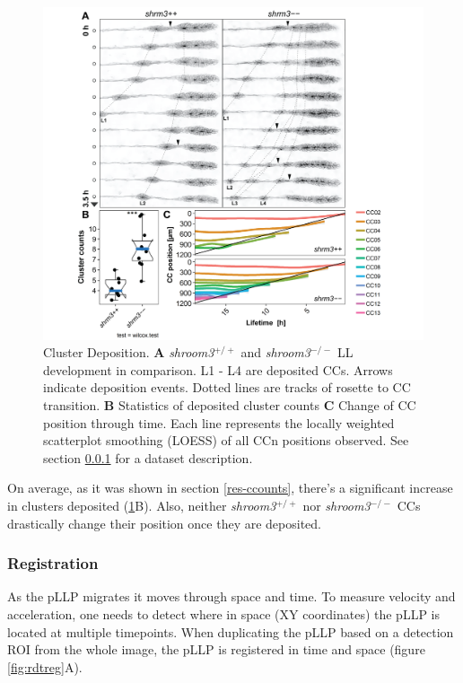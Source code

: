 \documentclass[10pt, b5paper, singlespacinge, twoside]{reedthesis} %
\theoremstyle{definition}
\theoremstyle{definition}
\theoremstyle{definition}
\theoremstyle{remark}
\begin{document}
\begin{figure}

{\centering \includegraphics[width=0.95\linewidth]{figures/results/03_rosettes/tracking-01} 

}

\caption[Cluster Deposition]{Cluster Deposition. \textbf{A} \emph{shroom3}\(^{+/+}\) and \emph{shroom3}\(^{-/-}\) LL development in comparison. L1 - L4 are deposited CCs. Arrows indicate deposition events. Dotted lines are tracks of rosette to CC transition. \textbf{B} Statistics of deposited cluster counts \textbf{C} Change of CC position through time. Each line represents the locally weighted scatterplot smoothing (LOESS) of all CCn positions observed. See section \ref{res-rosreg} for a dataset description.}\label{fig:rdtdepo}
\end{figure}
On average, as it was shown in section \ref{res-ccounts}, there's a significant increase in clusters deposited (\ref{fig:rdtdepo}B). Also, neither \emph{shroom3}\(^{+/+}\) nor \emph{shroom3}\(^{-/-}\) CCs drastically change their position once they are deposited.

\hypertarget{res-rosreg}{%
\subsubsection{Registration}\label{res-rosreg}}

As the pLLP migrates it moves through space and time. To measure velocity and acceleration, one needs to detect where in space (XY coordinates) the pLLP is located at multiple timepoints. When duplicating the pLLP based on a detection ROI from the whole image, the pLLP is registered in time and space (figure \ref{fig:rdtreg}A).
\end{document}
